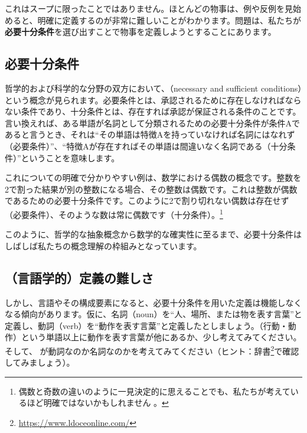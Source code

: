 これはスープに限ったことではありません。ほとんどの物事は、例や反例を見始めると、明確に定義するのが非常に難しいことがわかります。問題は、私たちが\textbf{必要十分条件}を選び出すことで物事を定義しようとすることにあります。

\subsection{必要十分条件}\label{sec:conditions}

哲学的および科学的な分野の双方において、（necessary and sufficient conditions）という概念が見られます。必要条件とは、承認されるために存在しなければならない条件であり、十分条件とは、存在すれば承認が保証される条件のことです。言い換えれば、ある単語が名詞として分類されるための必要十分条件が条件Aであると言うとき、それは\enquote{その単語は特徴Aを持っていなければ名詞にはなれず（必要条件）}、\enquote{特徴Aが存在すればその単語は間違いなく名詞である（十分条件）}ということを意味します。

これについての明確で分かりやすい例は、数学における偶数の概念です。整数を2で割った結果が別の整数になる場合、その整数は偶数です。これは整数が偶数であるための必要十分条件です。このように2で割り切れない偶数は存在せず（必要条件）、そのような数は常に偶数です（十分条件）。\footnote{偶数と奇数の違いのように一見決定的に思えることでも、私たちが考えているほど明確ではないかもしれません \autocite{Heubner2018}。}

このように、哲学的な抽象概念から数学的な確実性に至るまで、必要十分条件はしばしば私たちの概念理解の枠組みとなっています。

\subsection{（言語学的）定義の難しさ}\label{sec:definitions}

しかし、言語やその構成要素になると、必要十分条件を用いた定義は機能しなくなる傾向があります。仮に、名詞（noun）を\enquote{人、場所、または物を表す言葉}と定義し、動詞（verb）を\enquote{動作を表す言葉}と定義したとしましょう。（行動・動作）という単語以上に動作を表す言葉が他にあるか、少し考えてみてください。そして、 が動詞なのか名詞なのかを考えてみてください（ヒント：辞書\footnote{\url{https://www.ldoceonline.com/}}で確認してみましょう）。

